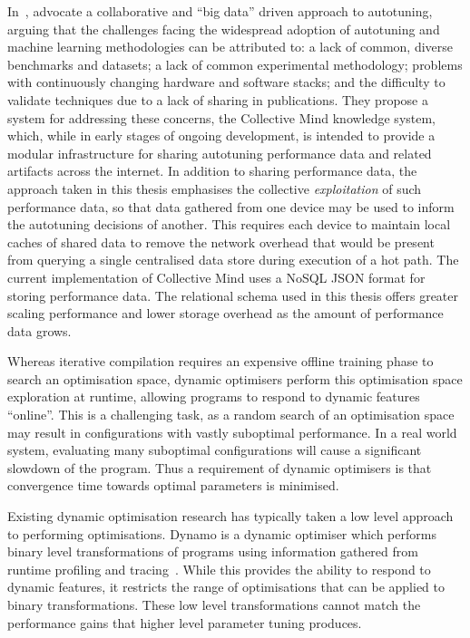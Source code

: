 In~\cite{Saclay2010,Memon2013,Fursin2014}, \citeauthor{Fursin2014}
advocate a collaborative and ``big data'' driven approach to
autotuning, arguing that the challenges facing the widespread adoption
of autotuning and machine learning methodologies can be attributed to:
a lack of common, diverse benchmarks and datasets; a lack of common
experimental methodology; problems with continuously changing hardware
and software stacks; and the difficulty to validate techniques due to
a lack of sharing in publications. They propose a system for
addressing these concerns, the Collective Mind knowledge system,
which, while in early stages of ongoing development, is intended to
provide a modular infrastructure for sharing autotuning performance
data and related artifacts across the internet. In addition to sharing
performance data, the approach taken in this thesis emphasises the
collective \emph{exploitation} of such performance data, so that data
gathered from one device may be used to inform the autotuning
decisions of another. This requires each device to maintain local
caches of shared data to remove the network overhead that would be
present from querying a single centralised data store during execution
of a hot path. The current implementation of Collective Mind uses a
NoSQL JSON format for storing performance data. The relational schema
used in this thesis offers greater scaling performance and lower
storage overhead as the amount of performance data grows.

Whereas iterative compilation requires an expensive offline training
phase to search an optimisation space, dynamic optimisers perform this
optimisation space exploration at runtime, allowing programs to
respond to dynamic features ``online''. This is a challenging task, as
a random search of an optimisation space may result in configurations
with vastly suboptimal performance. In a real world system, evaluating
many suboptimal configurations will cause a significant slowdown of
the program. Thus a requirement of dynamic optimisers is that
convergence time towards optimal parameters is minimised.

Existing dynamic optimisation research has typically taken a low level
approach to performing optimisations. Dynamo is a dynamic optimiser
which performs binary level transformations of programs using
information gathered from runtime profiling and
tracing~\cite{Bala2000}. While this provides the ability to respond to
dynamic features, it restricts the range of optimisations that can be
applied to binary transformations. These low level transformations
cannot match the performance gains that higher level parameter tuning
produces.

